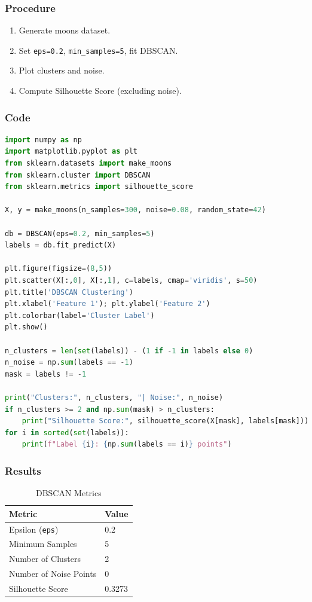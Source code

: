 \documentclass[a4paper,10pt]{article}
\begin{document}
\subsubsection{Procedure}
\begin{enumerate}[nosep]
    \item Generate moons dataset.
    \item Set \texttt{eps=0.2}, \texttt{min\_samples=5}, fit DBSCAN.
    \item Plot clusters and noise.
    \item Compute Silhouette Score (excluding noise).
\end{enumerate}

\subsubsection{Code}
\begin{lstlisting}[language=Python, caption={DBSCAN Implementation}]
import numpy as np
import matplotlib.pyplot as plt
from sklearn.datasets import make_moons
from sklearn.cluster import DBSCAN
from sklearn.metrics import silhouette_score

X, y = make_moons(n_samples=300, noise=0.08, random_state=42)

db = DBSCAN(eps=0.2, min_samples=5)
labels = db.fit_predict(X)

plt.figure(figsize=(8,5))
plt.scatter(X[:,0], X[:,1], c=labels, cmap='viridis', s=50)
plt.title('DBSCAN Clustering')
plt.xlabel('Feature 1'); plt.ylabel('Feature 2')
plt.colorbar(label='Cluster Label')
plt.show()

n_clusters = len(set(labels)) - (1 if -1 in labels else 0)
n_noise = np.sum(labels == -1)
mask = labels != -1

print("Clusters:", n_clusters, "| Noise:", n_noise)
if n_clusters >= 2 and np.sum(mask) > n_clusters:
    print("Silhouette Score:", silhouette_score(X[mask], labels[mask]))
for i in sorted(set(labels)):
    print(f"Label {i}: {np.sum(labels == i)} points")
\end{lstlisting}

\subsubsection{Results}
\begin{table}[H]
\centering
\caption{DBSCAN Metrics}
\begin{tabular}{ll}
\toprule
\textbf{Metric} & \textbf{Value} \\
\midrule
Epsilon (\texttt{eps}) & 0.2 \\
Minimum Samples & 5 \\
Number of Clusters & 2 \\
Number of Noise Points & 0 \\
Silhouette Score & 0.3273 \\
\bottomrule
\end{tabular}
\end{table}
\end{document}
